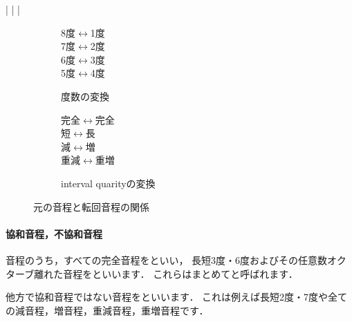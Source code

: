 \documentclass[dvipdfmx,uplatex,b5paper,openany,jbase=12Q,nomag*,textwidth-limit=44%
               ]{gachimuchi}[2020/05/05]
\begin{document}
\begin{Music}
  \nostartrule%
  \Startpiece%
  \Notes%
  \en\bar
  \Notes%
  \en\bar
  \Notes%
  \en\bar
  \Notes%
  \en\setdoublebar
  \endpiece%
\end{Music}
\begin{figure}[ht]
\centering
\begin{subfigure}{.4\linewidth}
\centering
8度$\longleftrightarrow$1度\\
7度$\longleftrightarrow$2度\\
6度$\longleftrightarrow$3度\\
5度$\longleftrightarrow$4度\\
\caption{度数の変換}
\end{subfigure}
\begin{subfigure}{.4\linewidth}
\centering
完全$\longleftrightarrow$完全\\
短$\longleftrightarrow$長\\
減$\longleftrightarrow$増\\
重減$\longleftrightarrow$重増\\
\caption{interval quarityの変換}
\end{subfigure}
\caption{元の音程と転回音程の関係}\vspace{-\Cvs}
\end{figure}

\paragraph{協和音程，不協和音程}
音程のうち，すべての完全音程をといい，
長短3度・6度およびその任意数オクターブ離れた音程をといいます．
これらはまとめてと呼ばれます．

他方で協和音程ではない音程をといいます．
これは例えば長短2度・7度や全ての減音程，増音程，重減音程，重増音程です．

\end{document}
